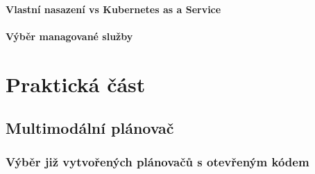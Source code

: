 \documentclass[thesis=M,czech]{FITthesis}[2019/12/23]
\theoremstyle{plain}
\theoremstyle{definition}
\begin{document}





\subsubsection{Vlastní nasazení vs Kubernetes as a Service}

\subsubsection{Výběr managované služby}










\chapter{Praktická část}


\section{Multimodální plánovač}
\subsection{Výběr již vytvořených plánovačů s otevřeným kódem}
\end{document}
